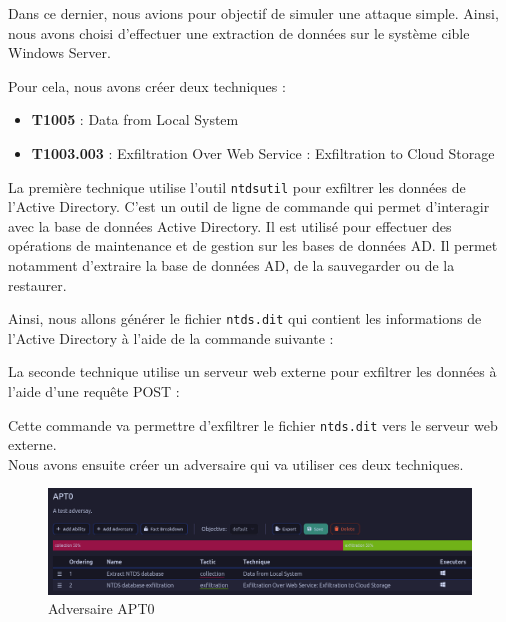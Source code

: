 \documentclass[12pt,letterpaper]{article}
\begin{document}
Dans ce dernier, nous avions pour objectif de simuler une attaque simple.
Ainsi, nous avons choisi d'effectuer une extraction de données sur le système cible Windows Server.

Pour cela, nous avons créer deux techniques :
\begin{itemize}
    \item \textbf{T1005} : Data from Local System
    \item \textbf{T1003.003} : Exfiltration Over Web Service : Exfiltration to Cloud Storage
\end{itemize}

La première technique utilise l'outil \verb|ntdsutil| pour exfiltrer les données de l'Active Directory.
C'est un outil de ligne de commande qui permet d'interagir avec la base de données Active Directory.
Il est utilisé pour effectuer des opérations de maintenance et de gestion sur les bases de données AD.
Il permet notamment d'extraire la base de données AD, de la sauvegarder ou de la restaurer.

Ainsi, nous allons générer le fichier \verb|ntds.dit| qui contient les informations de l'Active Directory à l'aide de la commande suivante :


La seconde technique utilise un serveur web externe pour exfiltrer les données à l'aide d'une requête POST :

Cette commande va permettre d'exfiltrer le fichier \verb|ntds.dit| vers le serveur web externe. \\

Nous avons ensuite créer un adversaire qui va utiliser ces deux techniques. \\

\begin{figure}[h!]
    \centering
    \includegraphics[width=1\textwidth]{images/caldera/apt0_adversary.png}
    \caption{Adversaire APT0}
    \label{fig:apt0_adversary}
\end{figure}
\end{document}

